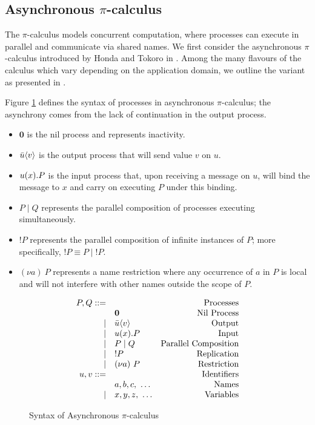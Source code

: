 \subsection{Asynchronous $\pi$-calculus}\label{section_async}

The $\pi$-calculus models concurrent computation, where processes can execute in parallel and communicate via shared names.
We first consider the asynchronous $\pi$-calculus introduced by Honda and Tokoro in \cite{AsyncHonda}.
Among the many flavours of the calculus which vary depending on the application domain, we outline the variant as presented in \cite{C406Lecture}. 

Figure \ref{fig:async} defines the syntax of processes in asynchronous $\pi$-calculus; the asynchrony comes from the lack of continuation in the output process.

\begin{itemize}
\item $\mathbf{0}$ is the nil process and represents inactivity.
\item $\bar{u}\langle v \rangle$ is the output process that will send value $v$ on $u$.
\item $u(x).P$ is the input process that, upon receiving a message on $u$, will bind the message to $x$ and carry on executing $P$ under this binding.
\item $P\mid Q$ represents the parallel composition of processes executing simultaneously.
\item $!P$ represents the parallel composition of infinite instances of $P$; more specifically, $!P \equiv P \mid {!P}$.
\item $(\nu a)~P$ represents a name restriction where any occurrence of $a$ in $P$ is local and will not interfere with other names outside the scope of $P$.
\end{itemize}


\begin{figure}[!hb]
\doublespacing
\[
\begin{array}{rlr}

P,Q ::= & & \text{Processes} \\
     & \mathbf{0} & \text{Nil Process} \\
\mid & \bar{u}\langle v \rangle & \text{Output} \\
\mid & u(x).P & \text{Input} \\     
\mid & P \mid Q & \text{Parallel Composition} \\
\mid & !P & \text{Replication} \\
\mid & (\nu a)~P & \text{Restriction} \\

u,v ::= & & \text{Identifiers} \\
     & a, b, c,~\dots & \text{Names} \\
\mid & x, y, z,~\dots & \text{Variables} \\

\end{array}
\]
\singlespacing
\caption{Syntax of Asynchronous $\pi$-calculus}
\label{fig:async}
\end{figure}

